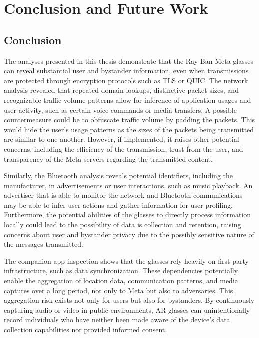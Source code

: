 \chapter{Conclusion and Future Work}
\label{chap:conclusionFutureWork}

%
%

\section*{Conclusion}
The analyses presented in this thesis demonstrate that the Ray-Ban Meta glasses can reveal substantial user and bystander information, even when transmissions are protected through encryption protocols such as TLS or QUIC. The network analysis revealed that repeated domain lookups, distinctive packet sizes, and recognizable traffic volume patterns allow for inference of application usages and user activity, such as certain voice commands or media transfers. A possible countermeasure could be to obfuscate traffic volume by padding the packets. This would hide the user's usage patterns as the sizes of the packets being transmitted are similar to one another. However, if implemented, it raises other potential concerns, including the efficiency of the transmission, trust from the user, and transparency of the Meta servers regarding the transmitted content.

Similarly, the Bluetooth analysis reveals potential identifiers, including the manufacturer, in advertisements or user interactions, such as music playback. An advertiser that is able to monitor the network and Bluetooth communications may be able to infer user actions and gather information for user profiling. Furthermore, the potential abilities of the glasses to directly process information locally could lead to the possibility of data is collection and retention, raising concerns about user and bystander privacy due to the possibly sensitive nature of the messages transmitted.

The companion app inspection shows that the glasses rely heavily on first-party infrastructure, such as data synchronization. These dependencies potentially enable the aggregation of location data, communication patterns, and media captures over a long period, not only to Meta but also to adversaries. This aggregation risk exists not only for users but also for bystanders. By continuously capturing audio or video in public environments, AR glasses can unintentionally record individuals who have neither been made aware of the device's data collection capabilities nor provided informed consent. 

